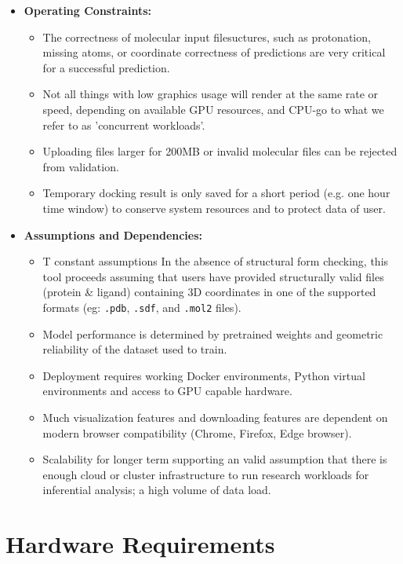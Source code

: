 \documentclass[12pt,a4]{report}
\begin{document}
\begin{itemize}
\item \textbf{Operating Constraints:}
\begin{itemize}
\item The correctness of molecular input filesuctures, such as protonation, missing atoms, or coordinate correctness of predictions are very critical for a successful prediction.
\item Not all things with low graphics usage will render at the same rate or speed, depending on available GPU resources, and CPU-go to what we refer to as 'concurrent workloads'.
\item Uploading files larger for 200MB or invalid molecular files can be rejected from validation.
\item Temporary docking result is only saved for a short period (e.g. one hour time window) to conserve system resources and to protect data of user.
\end{itemize}

\item \textbf{Assumptions and Dependencies:}
\begin{itemize}
\item T constant assumptions In the absence of structural form checking, this tool proceeds assuming that users have provided structurally valid files (protein \& ligand) containing 3D coordinates in one of the supported formats (eg: \texttt{.pdb}, \texttt{.sdf}, and \texttt{.mol2} files).
\item Model performance is determined by pretrained weights and geometric reliability of the dataset used to train.
\item Deployment requires working Docker environments, Python virtual environments and access to GPU capable hardware.
\item Much visualization features and downloading features are dependent on modern browser compatibility (Chrome, Firefox, Edge browser).
\item Scalability for longer term supporting an valid assumption that there is enough cloud or cluster infrastructure to run research workloads for inferential analysis; a high volume of data load.
\end{itemize}

\end{itemize}

\vspace{0.5cm}
\section{Hardware Requirements}
\end{document}
